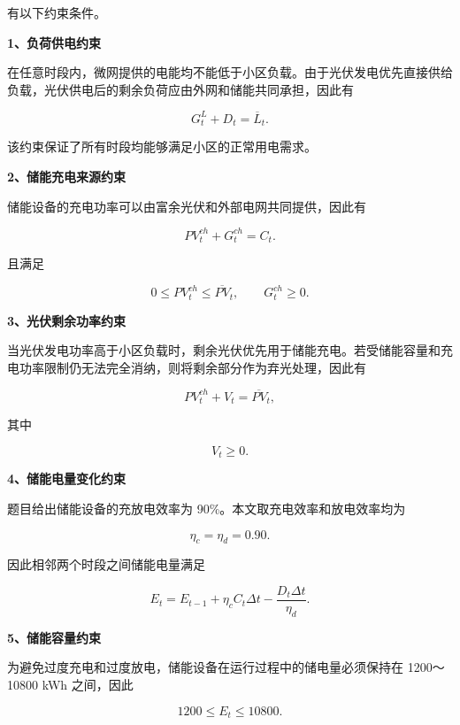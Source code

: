 有以下约束条件。

\textbf{1、负荷供电约束}

在任意时段内，微网提供的电能均不能低于小区负载。由于光伏发电优先直接供给负载，光伏供电后的剩余负荷应由外网和储能共同承担，因此有

\begin{equation}
G_t^L+D_t=\overline L_t.
\end{equation}

该约束保证了所有时段均能够满足小区的正常用电需求。

\textbf{2、储能充电来源约束}

储能设备的充电功率可以由富余光伏和外部电网共同提供，因此有

\begin{equation}
PV_t^{ch}+G_t^{ch}=C_t.
\end{equation}

且满足

\begin{equation}
0\leq PV_t^{ch}\leq\overline{PV}_t,
\qquad
G_t^{ch}\geq0.
\end{equation}

\textbf{3、光伏剩余功率约束}

当光伏发电功率高于小区负载时，剩余光伏优先用于储能充电。若受储能容量和充电功率限制仍无法完全消纳，则将剩余部分作为弃光处理，因此有

\begin{equation}
PV_t^{ch}+V_t=\overline{PV}_t,
\end{equation}

其中

\[
V_t\geq0.
\]

\textbf{4、储能电量变化约束}

题目给出储能设备的充放电效率为 90\%。本文取充电效率和放电效率均为

\[
\eta_c=\eta_d=0.90.
\]

因此相邻两个时段之间储能电量满足

\begin{equation}
E_t
=
E_{t-1}
+\eta_cC_t\Delta t
-\frac{D_t\Delta t}{\eta_d}.
\end{equation}

\textbf{5、储能容量约束}

为避免过度充电和过度放电，储能设备在运行过程中的储电量必须保持在 1200～10800 kWh 之间，因此

\begin{equation}
1200\leq E_t\leq10800.
\end{equation}

